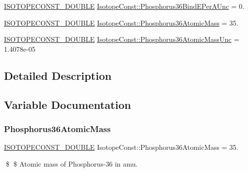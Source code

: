 \begin{DoxyCompactItemize}
\mbox{\hyperlink{group___isotope_const-_macros_ga8f45a7272ce02c0b4c65c44636ed719a}{I\+S\+O\+T\+O\+P\+E\+C\+O\+N\+S\+T\+\_\+\+D\+O\+U\+B\+LE}} \mbox{\hyperlink{group___isotope_const-_phosphorus-_p36_ga96accaa599a86153a81386f5f1d5383e}{Isotope\+Const\+::\+Phosphorus36\+Bind\+E\+Per\+A\+Unc}} = 0.
\item 
\mbox{\hyperlink{group___isotope_const-_macros_ga8f45a7272ce02c0b4c65c44636ed719a}{I\+S\+O\+T\+O\+P\+E\+C\+O\+N\+S\+T\+\_\+\+D\+O\+U\+B\+LE}} \mbox{\hyperlink{group___isotope_const-_phosphorus-_p36_gadccb8a2899b6b223bc425d63385828e6}{Isotope\+Const\+::\+Phosphorus36\+Atomic\+Mass}} = 35.
\item 
\mbox{\hyperlink{group___isotope_const-_macros_ga8f45a7272ce02c0b4c65c44636ed719a}{I\+S\+O\+T\+O\+P\+E\+C\+O\+N\+S\+T\+\_\+\+D\+O\+U\+B\+LE}} \mbox{\hyperlink{group___isotope_const-_phosphorus-_p36_gae5c1c757babc142c504e8b4ff904a9d3}{Isotope\+Const\+::\+Phosphorus36\+Atomic\+Mass\+Unc}} = 1.\+4078e-\/05
\end{DoxyCompactItemize}


\subsection{Detailed Description}


\subsection{Variable Documentation}
\mbox{\label{group___isotope_const-_phosphorus-_p36_gadccb8a2899b6b223bc425d63385828e6}} 
\subsubsection{\texorpdfstring{Phosphorus36\+Atomic\+Mass}{Phosphorus36AtomicMass}}
{\footnotesize\ttfamily \mbox{\hyperlink{group___isotope_const-_macros_ga8f45a7272ce02c0b4c65c44636ed719a}{I\+S\+O\+T\+O\+P\+E\+C\+O\+N\+S\+T\+\_\+\+D\+O\+U\+B\+LE}} Isotope\+Const\+::\+Phosphorus36\+Atomic\+Mass = 35.}

\$ \$ Atomic mass of Phosphorus-\/36 in amu. \mbox{\label{group___isotope_const-_phosphorus-_p36_gae5c1c757babc142c504e8b4ff904a9d3}} 
